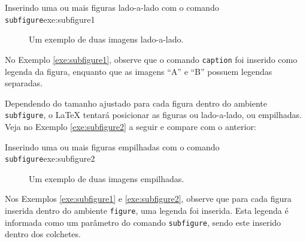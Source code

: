 \begin{texexptitled}[breakable,enhanced,middle=2mm]{Inserindo uma ou mais figuras lado-a-lado com o comando {\tt subfigure}}{exe:subfigure1}
\begin{figure}[H]
    \begin{center}
        \caption{Um exemplo de duas imagens lado-a-lado.}
    \end{center}
\end{figure}
\end{texexptitled}

No Exemplo \ref{exe:subfigure1}, observe que o comando \texttt{caption} foi inserido como legenda da figura, enquanto que as imagens ``A'' e ``B'' possuem legendas separadas.

Dependendo do tamanho ajustado para cada figura dentro do ambiente {\tt subfigure}, o \LaTeX{} tentará posicionar as figuras ou lado-a-lado, ou empilhadas. Veja no Exemplo \ref{exe:subfigure2} a seguir e compare com o anterior:

\begin{texexptitled}[breakable,enhanced,middle=2mm]{Inserindo uma ou mais figuras empilhadas com o comando {\tt subfigure}}{exe:subfigure2}
\begin{figure}[H]
    \begin{center}
        \caption{Um exemplo de duas imagens empilhadas.}
    \end{center}
\end{figure}
\end{texexptitled}

Nos Exemplos \ref{exe:subfigure1} e \ref{exe:subfigure2}, observe que para cada figura inserida dentro do ambiente {\tt figure}, uma legenda foi inserida. Esta legenda é informada como um parâmetro do comando {\tt subfigure}, sendo este inserido dentro dos colchetes. 



